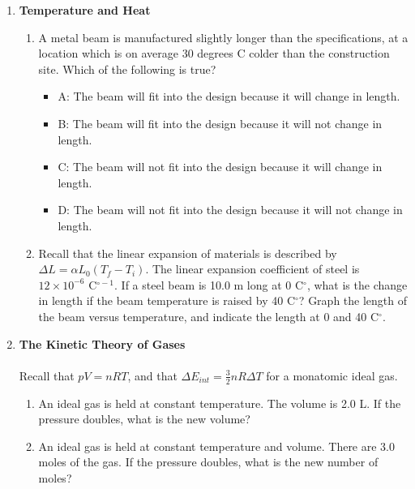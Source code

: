 \documentclass[10pt]{article}
\begin{document}
\maketitle

\begin{enumerate}
\item \textbf{Temperature and Heat}
\begin{enumerate}
\item A metal beam is manufactured slightly longer than the specifications, at a location which is on average 30 degrees C colder than the construction site.  Which of the following is true?
\begin{itemize}
\item A: The beam will fit into the design because it will change in length.
\item B: The beam will fit into the design because it will not change in length.
\item C: The beam will not fit into the design because it will change in length.
\item D: The beam will not fit into the design because it will not change in length.
\end{itemize}
\item Recall that the linear expansion of materials is described by $\Delta L = \alpha L_0 \left(T_f - T_i \right)$.  The linear expansion coefficient of steel is $12 \times 10^{-6}$ C$^{\circ -1}$.  If a steel beam is 10.0 m long at 0 C$^{\circ}$, what is the change in length if the beam temperature is raised by 40 C$^{\circ}$?  Graph the length of the beam versus temperature, and indicate the length at 0 and 40 C$^{\circ}$.  \\ \vspace{3cm}
\end{enumerate}
\item \textbf{The Kinetic Theory of Gases}
\\ \\ Recall that $pV = n R T$, and that $\Delta E_{int} = \frac{3}{2} n R \Delta T$ for a monatomic ideal gas.
\begin{enumerate}
\item An ideal gas is held at constant temperature.  The volume is 2.0 L.  If the pressure doubles, what is the new volume?  \\ \vspace{1cm}
\item An ideal gas is held at constant temperature and volume.  There are 3.0 moles of the gas.  If the pressure doubles, what is the new number of moles?  \\ \vspace{1cm}

\end{enumerate}
\end{enumerate}
\end{document}
